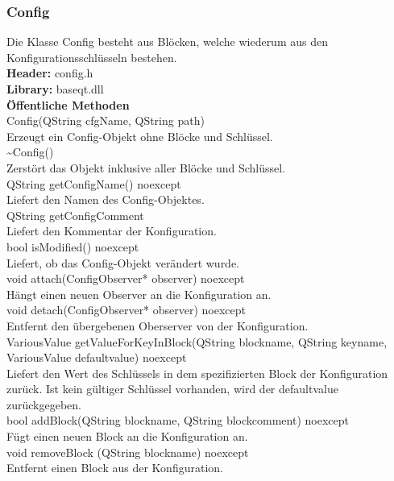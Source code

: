 \subsubsection{Config}
Die Klasse Config besteht aus Blöcken, welche wiederum aus den Konfigurationsschlüsseln bestehen.\bigskip \\
\textbf{Header:} config.h\bigskip \\
\textbf{Library:} baseqt.dll\bigskip \\
\textbf{Öffentliche Methoden}\\
\small{Config(QString cfgName, QString path)}\\
Erzeugt ein Config-Objekt ohne Blöcke und Schlüssel.\bigskip \\
\small{\~{}Config()}\\
Zerstört das Objekt inklusive aller Blöcke und Schlüssel.\bigskip \\
\small{QString getConfigName() noexcept}\\
Liefert den Namen des Config-Objektes.\bigskip \\
\small{QString getConfigComment}\\
Liefert den Kommentar der Konfiguration.\bigskip \\
\small{bool isModified() noexcept}\\
Liefert, ob das Config-Objekt verändert wurde.\bigskip \\
\small{void attach(ConfigObserver* observer) noexcept}\\
Hängt einen neuen Observer an die Konfiguration an.\bigskip \\
\small{void detach(ConfigObserver* observer) noexcept}\\
Entfernt den übergebenen Oberserver von der Konfiguration. \bigskip \\
\small{VariousValue getValueForKeyInBlock(QString blockname, QString keyname, VariousValue defaultvalue) noexcept}\\
Liefert den Wert des Schlüssels in dem spezifizierten Block der Konfiguration zurück. Ist kein gültiger Schlüssel vorhanden, wird der defaultvalue zurückgegeben.\bigskip \\
\small{bool addBlock(QString blockname, QString blockcomment) noexcept}\\
Fügt einen neuen Block an die Konfiguration an.\bigskip \\
\small{void removeBlock (QString blockname) noexcept}\\
Entfernt einen Block aus der Konfiguration.\bigskip \\
